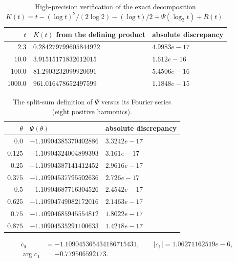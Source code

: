 \begin{table}[tbp]
\centering
\caption{High-precision verification of the exact decomposition $K(t)=t-(\log t)^2/(2\log2)-(\log t)/2+\Psi(\log_2t)+R(t)$.}
\label{tab:transseries-check}
\begin{tabular}{@{}rll@{}}
\toprule
$t$ & $K(t)$ from the defining product & absolute discrepancy \\
\midrule
$2.3$ & $0.284279799605844922$ & $4.9983e-17$ \\
$10.0$ & $3.91515171832612015$ & $1.612e-16$ \\
$100.0$ & $81.2903232099920691$ & $5.4506e-16$ \\
$1000.0$ & $961.016478652497599$ & $1.1848e-15$ \\
\bottomrule
\end{tabular}
\end{table}

\begin{table}[tbp]
\centering
\caption{The split-sum definition of $\Psi$ versus its Fourier series (eight positive harmonics).}
\label{tab:psi-check}
\begin{tabular}{@{}rll@{}}
\toprule
$\theta$ & $\Psi(\theta)$ & absolute discrepancy \\
\midrule
$0.0$ & $-1.10904385370402886$ & $3.3242e-17$ \\
$0.125$ & $-1.10904324004899393$ & $3.161e-17$ \\
$0.25$ & $-1.10904387141412452$ & $2.9616e-17$ \\
$0.375$ & $-1.10904537795502636$ & $2.726e-17$ \\
$0.5$ & $-1.10904687716304526$ & $2.4542e-17$ \\
$0.625$ & $-1.10904749082172016$ & $2.1463e-17$ \\
$0.75$ & $-1.10904685945554812$ & $1.8022e-17$ \\
$0.875$ & $-1.10904535291100633$ & $1.4218e-17$ \\
\bottomrule
\end{tabular}
\end{table}

\begin{equation}
\begin{aligned}
c_0&=-1.109045365434186715431,\qquad |c_1|=1.06271162519e-6,\\
\arg c_1&=-0.779506592173.
\end{aligned}
\label{eq:numerical-c1}
\end{equation}

